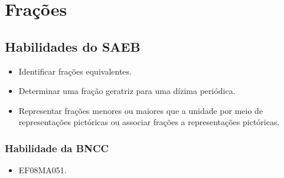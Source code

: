\chapter{Frações}

\section{Habilidades do SAEB}

\begin{itemize}
\item
  Identificar frações equivalentes.
\item
  Determinar uma fração geratriz para uma dízima periódica.
  \item Representar frações menores ou maiores que a
unidade por meio de representações pictóricas ou associar frações a
representações pictóricas.
\end{itemize}

\subsection{Habilidade da BNCC}

\begin{itemize}
  \item EF08MA051.
\end{itemize}

